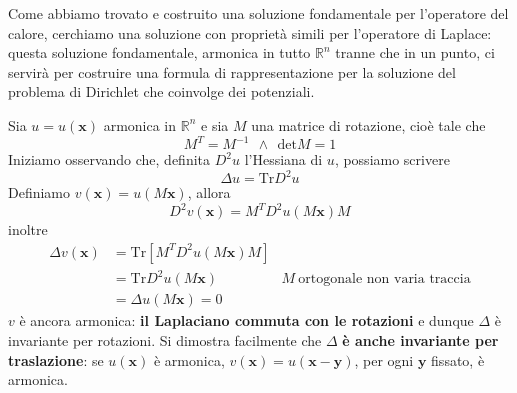 \documentclass[10pt,a4paper,twoside,openright]{book}
\newcommand{\x}{\mathbf{x}}
\newcommand{\y}{\mathbf{y}}
\begin{document}
Come abbiamo trovato e costruito una soluzione fondamentale per l'operatore del calore, cerchiamo una soluzione con proprietà simili per l'operatore di Laplace: questa soluzione fondamentale, armonica in tutto $\displaystyle \mathbb{R}^{n}$ tranne che in un punto, ci servirà per costruire una formula di rappresentazione per la soluzione del problema di Dirichlet che coinvolge dei potenziali.

Sia $\displaystyle u=u(\x)$ armonica in $\displaystyle \mathbb{R}^{n}$ e sia $M$ una matrice di rotazione, cioè tale che
\begin{equation*}
    M^{T} =M^{-1} \ \ \land \ \ \mathrm{det} M=1
\end{equation*}
Iniziamo osservando che, definita $\displaystyle D^{2} u$ l'Hessiana di $u$, possiamo scrivere
\begin{equation*}
    \Delta u=\mathrm{Tr} D^{2} u
\end{equation*}
Definiamo $v(\x) =u(M\x)$, allora
\begin{equation*}
    D^{2} v(\x) =M^{T} D^{2} u(M\x) M
\end{equation*}
inoltre
\begin{align*}
    \Delta v(\x) & =\mathrm{Tr}\left[ M^{T} D^{2} u(M\x) M\right] &                                        \\
                 & =\mathrm{Tr} D^{2} u(M\x)                      & M\ \text{ortogonale non varia traccia} \\
                 & =\Delta u(M\x) =0                              &
\end{align*}
$v$ è ancora armonica: \textbf{il Laplaciano commuta con le rotazioni} e dunque $\Delta $ è invariante per rotazioni. Si dimostra facilmente che $\Delta $ \textbf{è anche invariante per traslazione}: se $u(\x)$ è armonica, $v(\x) =u(\x-\y)$, per ogni $\y$ fissato, è armonica.
\end{document}
